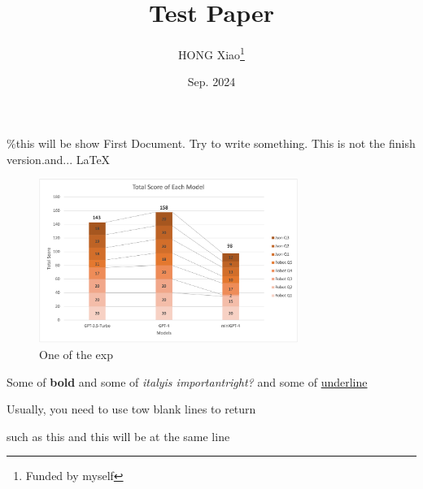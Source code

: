 \documentclass[12pt, letterpaper]{article}
\title{Test Paper}
\author{HONG Xiao\thanks{Funded by myself}}
\date{Sep. 2024}
\begin{document}
\maketitle
\%this will be show
First Document. Try to write something. This is not the finish version.and... \LaTeX{}
\begin{figure}
    \centering
    \includegraphics[width=0.75\textwidth]{scores_of_each_model}
    \caption{One of the exp}
    \label{Figure:34}
\end{figure}
Some of \textbf{bold} and some of \textit{italy\emph{is important}right?} and some of \underline{underline}

Usually, you need to use tow blank lines to return

such as this
and this will be at the same line
\end{document}
